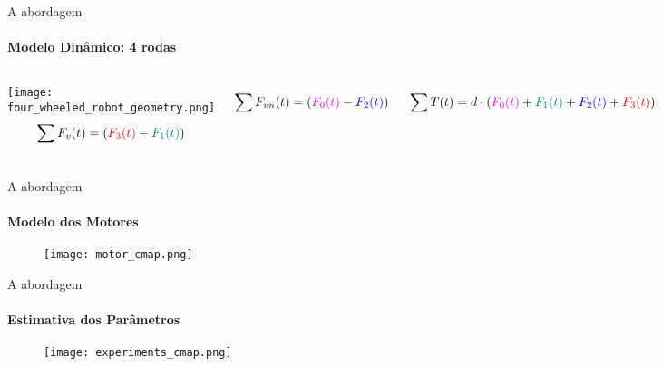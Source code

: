 \begin{frame}[t]{A abordagem}
  \transboxout[duration=0.5]
  \framesubtitle{Modelo Dinâmico: 4 rodas}
  \begin{columns}
    \texttt{[image: four\_wheeled\_robot\_geometry.png]}
      \begin{equation*}
        \sum F_v(t) = 
        \left(
          {\color[rgb]{1,0,0} F_3(t)} - 
          {\color[rgb]{0,0.5,0.5} F_1(t)}
        \right)
      \end{equation*}

      \begin{equation*}
        \sum F_{vn}(t) = 
        \left(
          {\color[rgb]{1,0,1} F_0(t)} - 
          {\color[rgb]{0,0,1} F_2(t)}
        \right)
      \end{equation*}

      \begin{equation*}
        \sum T(t) = 
        d\cdot
        \left(
          {\color[rgb]{1,0,1} F_0(t)} + 
          {\color[rgb]{0,0.5,0.5} F_1(t)} +
          {\color[rgb]{0,0,1} F_2(t)} +
          {\color[rgb]{1,0,0} F_3(t)} 
        \right)
      \end{equation*}
  \end{columns}
\end{frame}

\begin{frame}[c]{A abordagem}
  \framesubtitle{Modelo dos Motores}
  \transdissolve[duration=0.5]

  \begin{figure}[ht!]
    \centering

    \texttt{[image: motor\_cmap.png]}
    \label{fig:dynamic_map}

  \end{figure}


\end{frame}

\begin{frame}[c]{A abordagem}
  \framesubtitle{Estimativa dos Parâmetros}
  \transdissolve[duration=0.5]

  \begin{figure}[ht!]
    \centering

    \texttt{[image: experiments\_cmap.png]}
    \label{fig:experiments}

  \end{figure}


\end{frame}